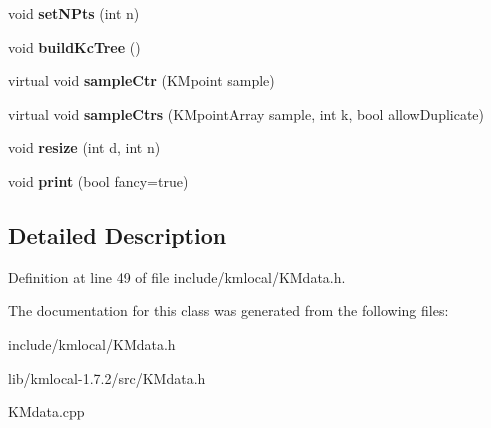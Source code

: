\begin{DoxyCompactItemize}
\item 
\hypertarget{class_k_mdata_a59a902b34429d61cfa691dea420efc83}{
void {\bfseries setNPts} (int n)}
\label{class_k_mdata_a59a902b34429d61cfa691dea420efc83}

\item 
\hypertarget{class_k_mdata_a9b97bf261617385e7d3718de30ad4ecb}{
void {\bfseries buildKcTree} ()}
\label{class_k_mdata_a9b97bf261617385e7d3718de30ad4ecb}

\item 
\hypertarget{class_k_mdata_a56f5db60430ef1a9fe9554bb9b02b0e3}{
virtual void {\bfseries sampleCtr} (KMpoint sample)}
\label{class_k_mdata_a56f5db60430ef1a9fe9554bb9b02b0e3}

\item 
\hypertarget{class_k_mdata_ae8dfb8f5c9e3b040a15aa5a84190cdd4}{
virtual void {\bfseries sampleCtrs} (KMpointArray sample, int k, bool allowDuplicate)}
\label{class_k_mdata_ae8dfb8f5c9e3b040a15aa5a84190cdd4}

\item 
\hypertarget{class_k_mdata_ac7169bffbd4db1b2e940c9fa27979548}{
void {\bfseries resize} (int d, int n)}
\label{class_k_mdata_ac7169bffbd4db1b2e940c9fa27979548}

\item 
\hypertarget{class_k_mdata_a4ad5756c40b82a5a651f712e8de316fc}{
void {\bfseries print} (bool fancy=true)}
\label{class_k_mdata_a4ad5756c40b82a5a651f712e8de316fc}

\end{DoxyCompactItemize}


\subsection{Detailed Description}


Definition at line 49 of file include/kmlocal/KMdata.h.



The documentation for this class was generated from the following files:\begin{DoxyCompactItemize}
\item 
include/kmlocal/KMdata.h\item 
lib/kmlocal-\/1.7.2/src/KMdata.h\item 
KMdata.cpp\end{DoxyCompactItemize}
